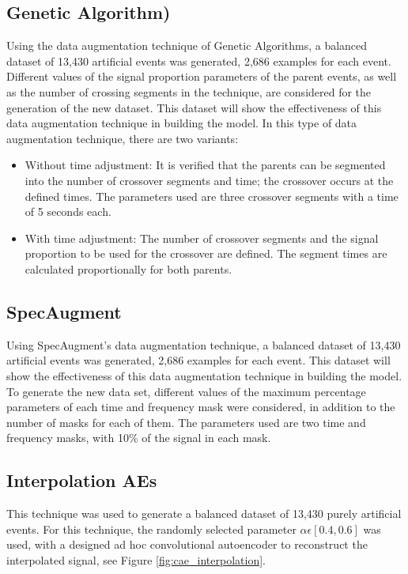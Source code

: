 \documentclass[journal]{IEEEtran}
\begin{document}
\subsection{Genetic Algorithm)}
Using the data augmentation technique of Genetic Algorithms, a balanced dataset of 13,430 artificial events was generated, 2,686 examples for each event. Different values of the signal proportion parameters of the parent events, as well as the number of crossing segments in the technique, are considered for the generation of the new dataset. This dataset will show the effectiveness of this data augmentation technique in building the model.
In this type of data augmentation technique, there are two variants:
\begin{itemize}
 \item Without time adjustment: It is verified that the parents can be segmented into the number of crossover segments and time; the crossover occurs at the defined times. The parameters used are three crossover segments with a time of 5 seconds each.
 \item With time adjustment: The number of crossover segments and the signal proportion to be used for the crossover are defined. The segment times are calculated proportionally for both parents.
\end{itemize}
\subsection{SpecAugment}
Using SpecAugment's data augmentation technique, a balanced dataset of 13,430 artificial events was generated, 2,686 examples for each event. This dataset will show the effectiveness of this data augmentation technique in building the model. To generate the new data set, different values of the maximum percentage parameters of each time and frequency mask were considered, in addition to the number of masks for each of them.
The parameters used are two time and frequency masks, with 10\% of the signal in each mask.

\subsection{Interpolation AEs}
This technique was used to generate a balanced dataset of 13,430 purely artificial events.
For this technique, the randomly selected parameter $\alpha\epsilon\left[0.4,0.6\right]$ was used, with a designed ad hoc convolutional autoencoder to reconstruct the interpolated signal, see Figure \ref{fig:cae_interpolation}.
\end{document}
